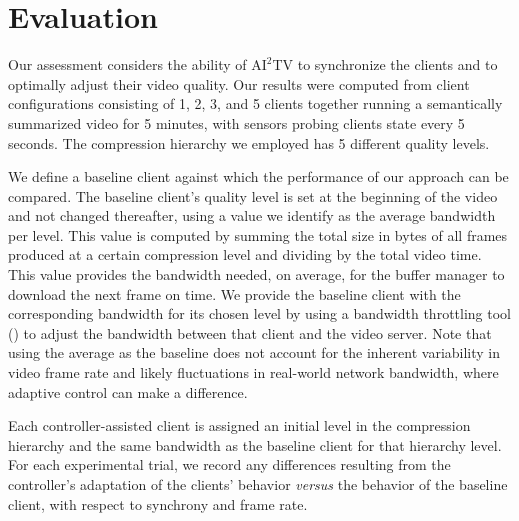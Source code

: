 \documentclass{sig-alternate}
\begin{document}
\section{Evaluation} \label{eval}

Our assessment considers the ability of $\mathrm{AI}^2$TV to
synchronize the clients and to optimally adjust their video quality.
Our results were computed from client configurations consisting of 1,
2, 3, and 5 clients together running a semantically summarized video
for 5 minutes, with sensors probing clients state every 5 seconds. The
compression hierarchy we employed has 5 different quality levels.

We define a baseline client against which the performance of our
approach can be compared.  The baseline client's quality level is set
at the beginning of the video and not changed thereafter, using a
value we identify as the average bandwidth per level. This value is
computed by summing the total size in bytes of all frames produced at
a certain compression level and dividing by the total video time.
This value provides the bandwidth needed, on average, for the buffer
manager to download the next frame on time.  We provide the baseline
client with the corresponding bandwidth for its chosen level by using
a bandwidth throttling tool (\cite{SHAPERD}) to adjust the bandwidth
between that client and the video server.  Note that using the average
as the baseline does not account for the inherent variability in video
frame rate and likely fluctuations in real-world network bandwidth,
where adaptive control can make a difference.

Each controller-assisted client is assigned an initial level in the
compression hierarchy and the same bandwidth as the baseline client
for that hierarchy level.  For each experimental trial, we record any
differences resulting from the controller's adaptation of the clients'
behavior {\it versus} the behavior of the baseline client, with
respect to synchrony and frame rate.
\end{document}
